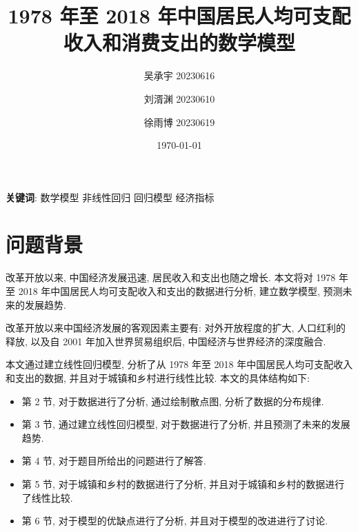 \documentclass{article}
\title{1978 年至 2018 年中国居民人均可支配收入和消费支出的数学模型}
\author{吴承宇 20230616 \and 刘湑渊 20230610 \and 徐雨博 20230619}
\date{\today}
\begin{document}
\maketitle
{}

\textbf{关键词}: 数学模型 \quad 非线性回归 \quad 回归模型 \quad 经济指标

\newpage

\tableofcontents

\newpage

\section{问题背景}
\par 改革开放以来, 中国经济发展迅速, 居民收入和支出也随之增长. 本文将对 1978 年至 2018 年中国居民人均可支配收入和支出的数据进行分析, 建立数学模型, 预测未来的发展趋势.\\
\par 改革开放以来中国经济发展的客观因素主要有: 对外开放程度的扩大, 人口红利的释放, 以及自 2001 年加入世界贸易组织后, 中国经济与世界经济的深度融合.\\
\par 本文通过建立线性回归模型, 分析了从 1978 年至 2018 年中国居民人均可支配收入和支出的数据, 并且对于城镇和乡村进行线性比较. 本文的具体结构如下:
\begin{itemize}
    \item 第 2 节, 对于数据进行了分析, 通过绘制散点图, 分析了数据的分布规律.
    \item 第 3 节, 通过建立线性回归模型, 对于数据进行了分析, 并且预测了未来的发展趋势.
    \item 第 4 节, 对于题目所给出的问题进行了解答.
    \item 第 5 节, 对于城镇和乡村的数据进行了分析, 并且对于城镇和乡村的数据进行了线性比较.
    \item 第 6 节, 对于模型的优缺点进行了分析, 并且对于模型的改进进行了讨论.
\end{itemize}
\end{document}
